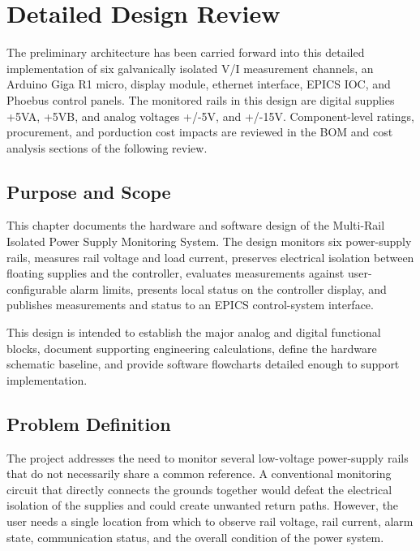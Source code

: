 \chapter{Detailed Design Review}
\label{chap:detailed-design}

\begin{weekthreechange}
    The preliminary architecture has been carried forward into this detailed implementation of six galvanically isolated V/I measurement channels, an Arduino Giga R1 micro, display module, ethernet interface, EPICS IOC, and Phoebus control panels. The monitored rails in this design are digital supplies +5VA, +5VB, and analog voltages +/-5V, and +/-15V. Component-level ratings, procurement, and porduction cost impacts are reviewed in the BOM and cost analysis sections of the following review.
\end{weekthreechange}

\section{Purpose and Scope}
This chapter documents the hardware and software design of the
Multi-Rail Isolated Power Supply Monitoring System. The design monitors six
power-supply rails, measures rail voltage and load current, preserves electrical
isolation between floating supplies and the controller, evaluates measurements
against user-configurable alarm limits, presents local status on the controller
display, and publishes measurements and status to an EPICS control-system
interface.

This design is intended to establish the major analog and digital
functional blocks, document supporting engineering calculations, define the
hardware schematic baseline, and provide software flowcharts detailed enough to
support implementation.

\section{Problem Definition}
The project addresses the need to monitor several low-voltage power-supply rails
that do not necessarily share a common reference. A conventional
monitoring circuit that directly connects the grounds together
would defeat the electrical isolation of the supplies and could create unwanted
return paths. However, the user needs a single location from which to observe rail voltage, rail current, alarm state, communication status, and the overall condition of the power system.

